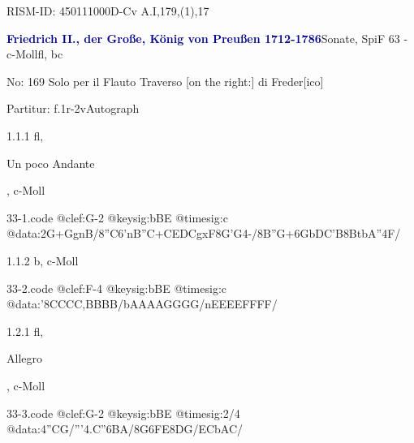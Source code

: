 \documentclass[a4paper, twocolumn, 11pt]{book}
\begin{document}
\par RISM-ID: 450111000\newline D-Cv  A.I,179,(1),17
\par \vspace{16pt} \textcolor{darkblue}{\textbf{Friedrich II., der Große, König von Preußen  1712-1786}}\hfillplus{[33]}\newline Sonate, SpiF 63 - c-Moll\newline fl, bc
\par \begin{itshape} No: 169 Solo per il Flauto Traverso [on the right:] di Freder[ico]\end{itshape} 
\par \textcolor{darkblue}{}  Partitur: f.1r-2v\newline Autograph
\par 1.1.1  fl, \begin{itshape}Un poco Andante\end{itshape}, c-Moll  
\begin{filecontents*}{33-1.code}
@clef:G-2
@keysig:bBE
@timesig:c
@data:2G+GgnB/{8''C6'nB''C}+{CEDC}gxF{8G'G}4-/8{B''G+}{6GbDC'B}{8BtbA}''4F/
\end{filecontents*}
\newline %
\par 1.1.2  b, c-Moll  
\begin{filecontents*}{33-2.code}
@clef:F-4
@keysig:bBE
@timesig:c
@data:'{8CCCC}{,BBBB}/{bAAAA}{GGGG}/{nEEEE}{FFFF}/
\end{filecontents*}
\newline %
\par 1.2.1  fl, \begin{itshape}Allegro\end{itshape}, c-Moll  
\begin{filecontents*}{33-3.code}
@clef:G-2
@keysig:bBE
@timesig:2/4
@data:4''CG/'''4.C''{6BA}/{8G6FE}{8DG}/{ECbAC}/
\end{filecontents*}
\newline %
\end{document}

